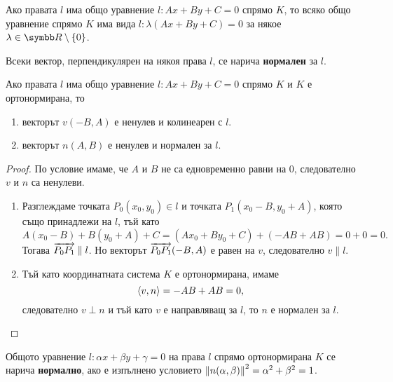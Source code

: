 \documentclass[
  numbers=endperiod,
  headings=standardclasses,
  bibliography=totocnumbered,
]{scrartcl}
\begin{document}
\begin{corollary}
  Ако правата \( l \) има общо уравнение \( l: Ax + By + C = 0 \) спрямо \( K \), то всяко общо уравнение спрямо \( K \) има вида \( l: \lambda(Ax + By + C) = 0 \) за някое \( \lambda \in \R \setminus \{ 0 \} \).
\end{corollary}

\begin{definition}
  Всеки вектор, перпендикулярен на някоя права \( l \), се нарича \textbf{нормален} за \( l \).
\end{definition}

\begin{proposition}
  Ако правата \( l \) има общо уравнение \( l: Ax + By + C = 0 \) спрямо \( K \) и \( K \) е ортонормирана, то
  \begin{enumerate}
    \item векторът \( v(-B, A) \) е ненулев и колинеарен с \( l \).
    \item векторът \( n(A, B) \) е ненулев и нормален за \( l \).
  \end{enumerate}
\end{proposition}
\begin{proof}
  По условие имаме, че \( A \) и \( B \) не са едновременно равни на \( 0 \), следователно \( v \) и \( n \) са ненулеви.
  \begin{enumerate}
    \item Разглеждаме точката \( P_0(x_0, y_0) \in l \) и точката \( P_1(x_0 - B, y_0 + A) \), която също принадлежи на \( l \), тъй като
    \begin{equation*}
      A(x_0 - B) + B(y_0 + A) + C = (Ax_0 + By_0 + C) + (-AB + AB) = 0 + 0 = 0.
    \end{equation*}
     Тогава \( \overrightarrow{P_0 P_1} \parallel l \). Но векторът \( \overrightarrow{P_0 P_1}(-B, A) \) е равен на \( v \), следователно \( v \parallel l \).

    \item Тъй като координатната система \( K \) е ортонормирана, имаме
    \begin{equation*}
      \left\langle v, n \right\rangle = -AB + AB = 0,
    \end{equation*}
    следователно \( v \perp n \) и тъй като \( v \) е направляващ за \( l \), то \( n \) е нормален за \( l \).
  \end{enumerate}
\end{proof}

\begin{definition}
  Общото уравнение \( l: \alpha x + \beta y + \gamma = 0 \) на права \( l \) спрямо ортонормирана \( K \) се нарича \textbf{нормално}, ако е изпълнено условието \( \left\Vert n(\alpha, \beta) \right\Vert^2 = \alpha^2 + \beta^2 = 1 \).
\end{definition}
\end{document}
